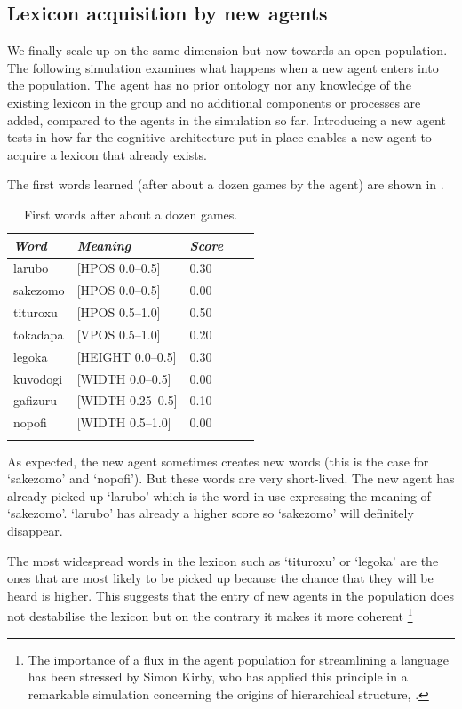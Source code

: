 \subsection{Lexicon acquisition by new agents}

We finally scale up on the same dimension but 
now towards an open population. The following 
simulation examines what happens when a new agent 
enters into the population. The agent has no 
prior ontology nor any knowledge of the existing
lexicon in the group and no additional components
or processes are added, compared to the agents
in the simulation so far. Introducing a new 
agent tests in how far the cognitive architecture
put in place enables a new agent to acquire a 
lexicon that already exists. 

The first words learned (after about a dozen 
games by the agent) are shown in . 


\begin{table}
\begin{center}
\begin{tabular}{ l  l  l  l  l }
\lsptoprule
{\itshape Word} & {\itshape Meaning} & {\itshape Score} \\ \midrule
larubo  & [HPOS 0.0–0.5] & 0.30 \\ 
sakezomo &  [HPOS 0.0–0.5] & 0.00 \\ 
tituroxu &  [HPOS 0.5–1.0] & 0.50 \\ 
tokadapa & [VPOS 0.5–1.0] & 0.20 \\ 
legoka   & [HEIGHT 0.0–0.5] & 0.30 \\ 
kuvodogi  & [WIDTH 0.0–0.5] & 0.00 \\ 
gafizuru &  [WIDTH 0.25–0.5] & 0.10  \\ 
nopofi  & [WIDTH 0.5–1.0] & 0.00 \\ 
\lspbottomrule
\end{tabular}
\caption{\label{tab:first}First words after about a dozen games.}
\end{center}
\end{table}

As expected, the new 
agent sometimes creates new words (this is the case 
for `sakezomo' and `nopofi'). But these words are 
very short-lived. The new agent has already picked up 
`larubo' which is the word in use expressing the 
meaning of `sakezomo'. `larubo' has already a higher 
score so `sakezomo' will definitely disappear. 

The most widespread words in the lexicon 
such as `tituroxu' or `legoka' are the ones that 
are most likely to be picked up because the chance
that they will be heard is higher. This suggests
that the entry of new agents in the population does
not destabilise the lexicon but on the contrary 
it makes it more coherent \footnote{The importance of a flux in the agent population for
streamlining a language has been stressed by Simon Kirby, who 
has applied this principle in a remarkable simulation 
concerning the origins of hierarchical structure, \cite{Kirby:1999}.}

